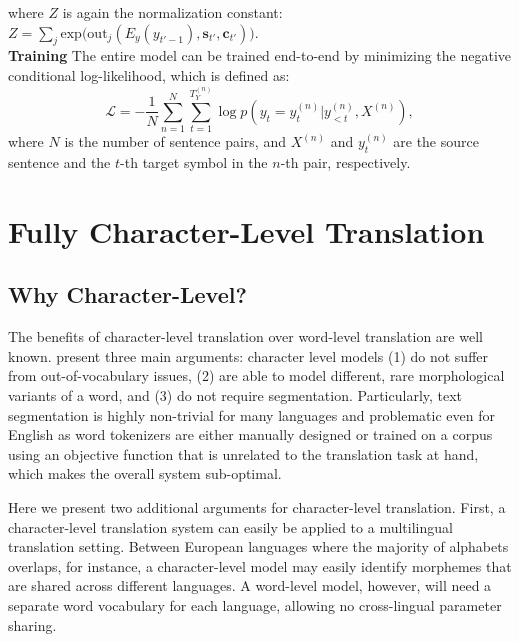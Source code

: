 \documentclass[11pt,letterpaper]{article}
\newcommand{\tb}{\textbf}
\newcommand{\mb}{\mathbf}
\newcommand{\fexp}{\text{exp}}
\newcommand{\foutj}{\text{out}_j}
\newcommand{\trgemb}{E_y}
\begin{document}
where $Z$ is again the normalization constant: $Z={\sum_{j}^{}\fexp\big(\foutj(\trgemb(y_{t'-1}),\mb{s}_{t'},\mb{c}_{t'})\big)}.$ \\

\noindent\tb{Training} The entire model can be trained end-to-end by minimizing the negative conditional log-likelihood, which is defined as:
$$\mathcal{L} = -\frac{1}{N}\sum_{n=1}^{N}\sum_{t=1}^{T_Y^{(n)}}\log p(y_t=y_t^{(n)} | y_{<t}^{(n)},X^{(n)}),$$
where $N$ is the number of sentence pairs, and $X^{(n)}$ and $y_t^{(n)}$ are the source sentence and the $t$-th target symbol in the $n$-th pair, respectively. 


\section{Fully Character-Level Translation}\label{sec:why}

    \subsection{Why Character-Level?}
    
    The benefits of character-level translation over word-level translation are well known.  present three main arguments: character level models (1) do not suffer from out-of-vocabulary issues, (2) are able to model different, rare morphological variants of a word, and (3) do not require segmentation. Particularly, text segmentation is highly non-trivial for many languages and problematic even for English as word tokenizers are either manually designed or trained on a corpus using an objective function that is unrelated to the translation task at hand, which makes the overall system sub-optimal.
    
    Here we present two additional arguments for character-level translation. First, a character-level translation system can easily be applied to a multilingual translation setting. Between European languages where the majority of alphabets overlaps, for instance, a character-level model may easily identify morphemes that are shared across different languages. A word-level model, however, will need a separate word vocabulary for each language, allowing no cross-lingual parameter sharing.
\end{document}
